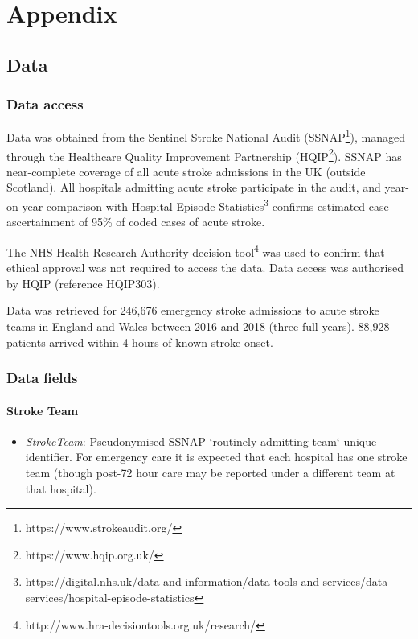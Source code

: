 \appendix
\section{Appendix}

\subsection{Data}

\subsubsection{Data access}

Data was obtained from the Sentinel Stroke National Audit (SSNAP\footnote{https://www.strokeaudit.org/}), managed through the Healthcare Quality Improvement Partnership (HQIP\footnote{https://www.hqip.org.uk/}). SSNAP has near-complete coverage of all acute stroke admissions in the UK (outside Scotland). All hospitals admitting acute stroke participate in the audit, and year-on-year comparison with Hospital Episode Statistics\footnote{https://digital.nhs.uk/data-and-information/data-tools-and-services/data-services/hospital-episode-statistics} confirms estimated case ascertainment of 95\% of coded cases of acute stroke.

The NHS Health Research Authority decision tool\footnote{http://www.hra-decisiontools.org.uk/research/} was used to confirm that ethical approval was not required to access the data. Data access was authorised by HQIP (reference HQIP303). 

Data was retrieved for 246,676 emergency stroke admissions to acute stroke teams in England and Wales between 2016 and 2018 (three full years). 88,928 patients arrived within 4 hours of known stroke onset.

\subsubsection{Data fields}

\paragraph{Stroke Team}

\begin{itemize}
\item \emph{StrokeTeam}: Pseudonymised SSNAP `routinely admitting team` unique
  identifier. For emergency care it is expected that each hospital has
  one stroke team (though post-72 hour care may be reported under a
  different team at that hospital).
\end{itemize}

